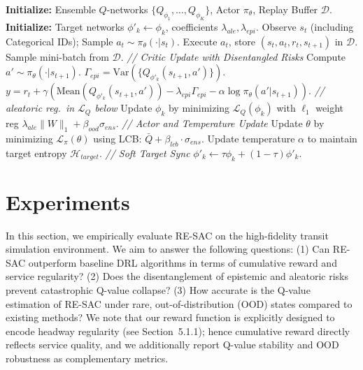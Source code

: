\documentclass[10pt]{article}
\begin{document}
\begin{algorithm}[H]
\caption{Robust-Ensemble Soft Actor-Critic (RE-SAC)}
\label{alg:resac}
\begin{algorithmic}
\STATE \textbf{Initialize:} Ensemble $Q$-networks $\{Q_{\phi_1}, \dots, Q_{\phi_K}\}$, Actor $\pi_\theta$, Replay Buffer $\mathcal{D}$.
\STATE \textbf{Initialize:} Target networks $\phi'_k \leftarrow \phi_k$, coefficients $\lambda_{ale}, \lambda_{epi}$.
        \STATE Observe $s_t$ (including Categorical IDs); Sample $a_t \sim \pi_\theta(\cdot|s_t)$.
        \STATE Execute $a_t$, store $(s_t, a_t, r_t, s_{t+1})$ in $\mathcal{D}$.
        \STATE Sample mini-batch from $\mathcal{D}$.
        \STATE \textit{// Critic Update with Disentangled Risks}
        \STATE Compute $a' \sim \pi_\theta(\cdot|s_{t+1})$.
        \STATE $\Gamma_{epi} = \text{Var}(\{Q_{\phi'_k}(s_{t+1}, a')\})$.
        \STATE $y = r_t + \gamma \left( \text{Mean}(Q_{\phi'_k}(s_{t+1}, a')) - \lambda_{epi} \Gamma_{epi} - \alpha \log \pi_\theta(a'|s_{t+1}) \right)$. \hfill \textit{// aleatoric reg.\ in $\mathcal{L}_Q$ below}
            \STATE Update $\phi_k$ by minimizing $\mathcal{L}_Q(\phi_k)$ with $\ell_1$ weight reg $\lambda_{ale} \|W\|_1 + \beta_{ood} \sigma_{ens}$.
        \ENDFOR
        \STATE \textit{// Actor and Temperature Update}
        \STATE Update $\theta$ by minimizing $\mathcal{L}_\pi(\theta)$ using LCB: $\bar{Q} + \beta_{lcb} \cdot \sigma_{ens}$.
        \STATE Update temperature $\alpha$ to maintain target entropy $\mathcal{H}_{target}$.
        \STATE \textit{// Soft Target Sync}
        \STATE $\phi'_k \leftarrow \tau \phi_k + (1-\tau) \phi'_k$.
    \ENDFOR
\ENDFOR
\end{algorithmic}
\end{algorithm}

\section{Experiments}
In this section, we empirically evaluate RE-SAC on the high-fidelity transit simulation environment. We aim to answer the following questions: (1) Can RE-SAC outperform baseline DRL algorithms in terms of cumulative reward and service regularity? (2) Does the disentanglement of epistemic and aleatoric risks prevent catastrophic Q-value collapse? (3) How accurate is the Q-value estimation of RE-SAC under rare, out-of-distribution (OOD) states compared to existing methods? We note that our reward function is explicitly designed to encode headway regularity (see Section~5.1.1); hence cumulative reward directly reflects service quality, and we additionally report Q-value stability and OOD robustness as complementary metrics.
\end{document}

